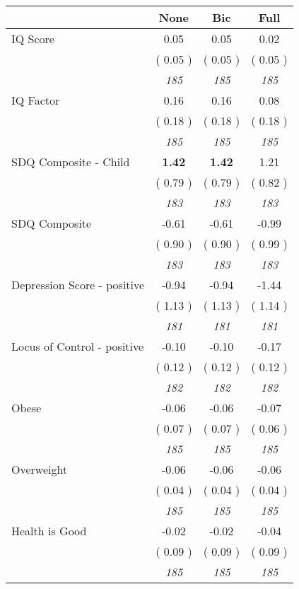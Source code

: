 \begin{tabular}{l c c c}
\toprule
 & None & Bic & Full \\
\midrule
IQ Score &      0.05 &      0.05 &      0.02 \\
& (     0.05 ) & (     0.05 ) & (     0.05 ) \\
& \textit{ 185 } & \textit{ 185 } & \textit{ 185 } \\
IQ Factor &      0.16 &      0.16 &      0.08 \\
& (     0.18 ) & (     0.18 ) & (     0.18 ) \\
& \textit{ 185 } & \textit{ 185 } & \textit{ 185 } \\
SDQ Composite - Child & \textbf{      1.42 } & \textbf{      1.42 } &      1.21 \\
& (     0.79 ) & (     0.79 ) & (     0.82 ) \\
& \textit{ 183 } & \textit{ 183 } & \textit{ 183 } \\
SDQ Composite &     -0.61 &     -0.61 &     -0.99 \\
& (     0.90 ) & (     0.90 ) & (     0.99 ) \\
& \textit{ 183 } & \textit{ 183 } & \textit{ 183 } \\
Depression Score - positive &     -0.94 &     -0.94 &     -1.44 \\
& (     1.13 ) & (     1.13 ) & (     1.14 ) \\
& \textit{ 181 } & \textit{ 181 } & \textit{ 181 } \\
Locus of Control - positive &     -0.10 &     -0.10 &     -0.17 \\
& (     0.12 ) & (     0.12 ) & (     0.12 ) \\
& \textit{ 182 } & \textit{ 182 } & \textit{ 182 } \\
Obese &     -0.06 &     -0.06 &     -0.07 \\
& (     0.07 ) & (     0.07 ) & (     0.06 ) \\
& \textit{ 185 } & \textit{ 185 } & \textit{ 185 } \\
Overweight &     -0.06 &     -0.06 &     -0.06 \\
& (     0.04 ) & (     0.04 ) & (     0.04 ) \\
& \textit{ 185 } & \textit{ 185 } & \textit{ 185 } \\
Health is Good &     -0.02 &     -0.02 &     -0.04 \\
& (     0.09 ) & (     0.09 ) & (     0.09 ) \\
& \textit{ 185 } & \textit{ 185 } & \textit{ 185 } \\

\end{tabular}
